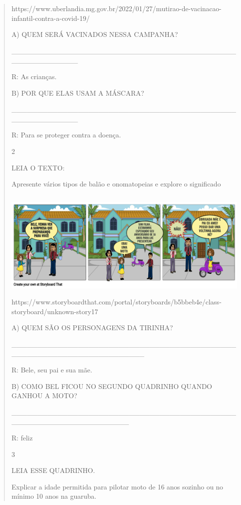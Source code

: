 \begin{verse}
{{{https://www.uberlandia.mg.gov.br/2022/01/27/mutirao-de-vacinacao-infantil-contra-a-covid-19/

A) QUEM SERÁ VACINADOS NESSA CAMPANHA?

\_\_\_\_\_\_\_\_\_\_\_\_\_\_\_\_\_\_\_\_\_\_\_\_\_\_\_\_\_\_\_\_\_\_\_\_\_\_\_\_\_\_\_\_\_\_\_\_\_\_\_\_\_\_\_\_\_

R: As crianças.

B) POR QUE ELAS USAM A MÁSCARA?

\_\_\_\_\_\_\_\_\_\_\_\_\_\_\_\_\_\_\_\_\_\_\_\_\_\_\_\_\_\_\_\_\_\_\_\_\_\_\_\_\_\_\_\_\_\_\_\_\_\_\_\_\_\_\_\_\_

R: Para se proteger contra a doença.

\num{2}

LEIA O TEXTO:

Apresente vários tipos de balão e onomatopeias e explore o significado

\includegraphics[width=5.56806in,height=2.13216in]{media/image129.png}https://www.storyboardthat.com/portal/storyboards/b5bbeb4e/class-storyboard/unknown-story17

A) QUEM SÃO OS PERSONAGENS DA TIRINHA?

\_\_\_\_\_\_\_\_\_\_\_\_\_\_\_\_\_\_\_\_\_\_\_\_\_\_\_\_\_\_\_\_\_\_\_\_\_\_\_\_\_\_\_\_\_\_\_\_\_\_\_\_\_\_\_\_\_\_\_\_\_\_\_\_\_\_\_\_\_\_

R: Bele, seu pai e sua mãe.

B) COMO BEL FICOU NO SEGUNDO QUADRINHO QUANDO GANHOU A MOTO?

\_\_\_\_\_\_\_\_\_\_\_\_\_\_\_\_\_\_\_\_\_\_\_\_\_\_\_\_\_\_\_\_\_\_\_\_\_\_\_\_\_\_\_\_\_\_\_\_\_\_\_\_\_\_\_\_\_\_\_\_\_\_\_\_\_\_\_

R: feliz

\num{3}

LEIA ESSE QUADRINHO.

Explicar a idade permitida para pilotar moto de 16 anos sozinho ou no
mínimo 10 anos na guaruba.

}}}
\end{verse}
